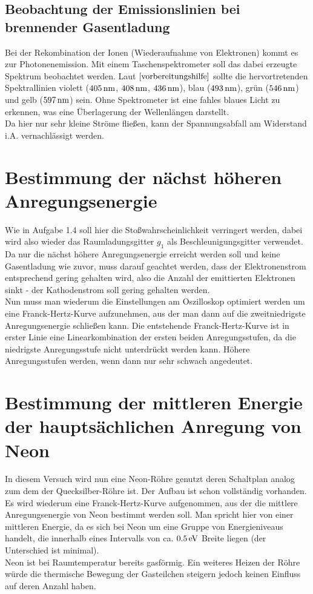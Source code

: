\documentclass[a4paper,titlepage]{scrartcl}
\numberwithin{equation}{section}
\begin{document}
\subsection{Beobachtung der Emissionslinien bei brennender Gasentladung}

Bei der Rekombination der Ionen (Wiederaufnahme von Elektronen) kommt es zur Photonenemission. Mit einem Taschenspektrometer soll das dabei erzeugte Spektrum beobachtet werden. Laut $\cite{vorbereitungshilfe}$ sollte die hervortretenden Spektrallinien violett ($\unit[405]{nm}$, $\unit[408]{nm}$, $\unit[436]{nm}$), blau ($\unit[493]{nm}$), grün ($\unit[546]{nm}$) und gelb ($\unit[597]{nm}$) sein. Ohne Spektrometer ist eine fahles blaues Licht zu erkennen, was eine Überlagerung der Wellenlängen darstellt.\\
Da hier nur sehr kleine Ströme fließen, kann der Spannungsabfall am Widerstand i.A. vernachlässigt werden.

\section{Bestimmung der nächst höheren Anregungsenergie}

Wie in Aufgabe 1.4 soll hier die Stoßwahrscheinlichkeit verringert werden, dabei wird also wieder das Raumladungsgitter $g_1$ als Beschleunigungsgitter verwendet. Da nur die nächst höhere Anregungsenergie erreicht werden soll und keine Gasentladung wie zuvor, muss darauf geachtet werden, dass der Elektronenstrom entsprechend gering gehalten wird, also die Anzahl der emittierten Elektronen sinkt - der Kathodenstrom soll gering gehalten werden.\\
Nun muss man wiederum die Einstellungen am Oszilloskop optimiert werden um eine Franck-Hertz-Kurve aufzunehmen, aus der man dann auf die zweitniedrigste Anregungsenergie schließen kann. Die entstehende Franck-Hertz-Kurve ist in erster Linie eine Linearkombination der ersten beiden Anregungsstufen, da die niedrigste Anregungsstufe nicht unterdrückt werden kann. Höhere Anregungsstufen werden, wenn dann nur sehr schwach angedeutet.

\section{Bestimmung der mittleren Energie der hauptsächlichen Anregung von Neon}

In diesem Versuch wird nun eine Neon-Röhre genutzt deren Schaltplan analog zum dem der Quecksilber-Röhre ist. Der Aufbau ist schon vollständig vorhanden. Es wird wiederum eine Franck-Hertz-Kurve aufgenommen, aus der die mittlere Anregungsenergie von Neon bestimmt werden soll. Man spricht hier von einer mittleren Energie, da es sich bei Neon um eine Gruppe von Energieniveaus handelt, die innerhalb eines Intervalls von ca. $\unit[0.5]{eV}$ Breite liegen (der Unterschied ist minimal).\\
Neon ist bei Raumtemperatur bereits gasförmig. Ein weiteres Heizen der Röhre würde die thermische Bewegung der Gasteilchen steigern jedoch keinen Einfluss auf deren Anzahl haben. 
 


\end{document}
